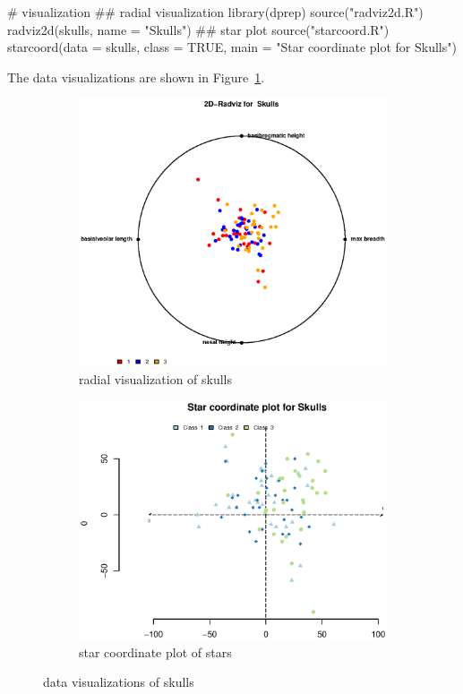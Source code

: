 \documentclass{article}
\begin{document}
\begin{enumerate}[leftmargin = 0 em, label = \arabic*., font = \bfseries]
\begin{rcode}
# visualization
## radial visualization
library(dprep)
source("radviz2d.R")
radviz2d(skulls, name = "Skulls")
## star plot
source("starcoord.R")
starcoord(data = skulls, class = TRUE, main = "Star coordinate plot for Skulls")
	\end{rcode}
	The data visualizations are shown in Figure~\ref{radviz_stars}.
	\begin{figure}[!htb]
	    \centering
		\begin{subfigure}[b]{0.5\textwidth}
		\includegraphics[width = \textwidth]{radviz.eps}
		\caption{radial visualization of skulls}
		\end{subfigure}%
		\begin{subfigure}[b]{0.5\textwidth}
		\includegraphics[width = \textwidth]{starcoord.eps}
		\caption{star coordinate plot of stars}
		\end{subfigure}
		\caption{data visualizations of skulls}
		\label{radviz_stars}
	\end{figure}


\end{enumerate}
\end{document}
